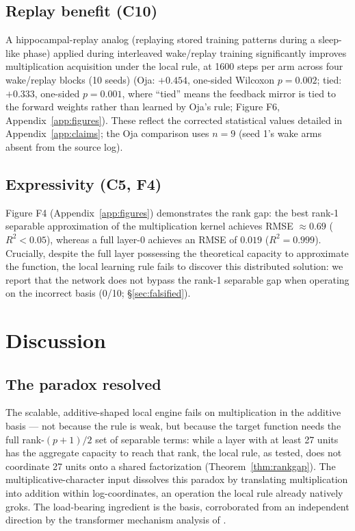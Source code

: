 \documentclass[11pt]{article}
\begin{document}
\subsection{Replay benefit (C10)}\label{sec:replay}
A hippocampal-replay analog (replaying stored training patterns during a sleep-like phase) applied during interleaved wake/replay training significantly improves multiplication acquisition under the local rule, at 1600 steps per arm across four wake/replay blocks (10 seeds) (Oja: $+0.454$, one-sided Wilcoxon $p = 0.002$; tied: $+0.333$, one-sided $p = 0.001$, where ``tied'' means the feedback mirror is tied to the forward weights rather than learned by Oja's rule; Figure F6, Appendix~\ref{app:figures}). These reflect the corrected statistical values detailed in Appendix~\ref{app:claims}; the Oja comparison uses $n{=}9$ (seed 1's wake arms absent from the source log).

\subsection{Expressivity (C5, F4)}\label{sec:expressivity}
Figure F4 (Appendix~\ref{app:figures}) demonstrates the rank gap: the best rank-1 separable approximation of the multiplication kernel achieves RMSE $\approx 0.69$ ($R^2 < 0.05$), whereas a full layer-0 achieves an RMSE of $0.019$ ($R^2 = 0.999$). Crucially, despite the full layer possessing the theoretical capacity to approximate the function, the local learning rule fails to discover this distributed solution: we report that the network does not bypass the rank-1 separable gap when operating on the incorrect basis (0/10; \S\ref{sec:falsified}).

\section{Discussion}\label{sec:discussion}
\subsection{The paradox resolved}\label{sec:paradox}
The scalable, additive-shaped local engine fails on multiplication in the additive basis --- not because the rule is weak, but because the target function needs the full rank-$(p+1)/2$ set of separable terms: while a layer with at least 27 units has the aggregate capacity to reach that rank, the local rule, as tested, does not coordinate 27 units onto a shared factorization (Theorem~\ref{thm:rankgap}). The multiplicative-character input dissolves this paradox by translating multiplication into addition within log-coordinates, an operation the local rule already natively groks. The load-bearing ingredient is the basis, corroborated from an independent direction by the transformer mechanism analysis of \cite{nguyen2026}.
\end{document}
